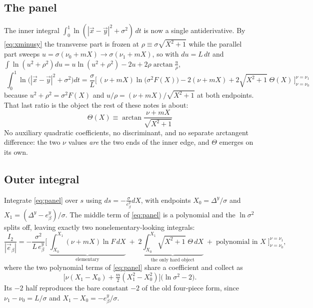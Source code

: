 \documentclass[11pt]{article}
\numberwithin{equation}{section}
\newcommand{\vv}[1]{\vec{#1}}
\begin{document}
\subsection{The panel}
The inner integral $\int_0^1\ln(|\vv x-\vv y|^2+\sigma^2)\,dt$ is now a single antiderivative. By
\eqref{eq:xminusy} the transverse part is frozen at $\rho\equiv\sigma\sqrt{X^2+1}$ while the parallel
part sweeps $u=\sigma(\nu_0+mX)\to\sigma(\nu_1+mX)$, so with $du=L\,dt$ and
$\int\ln(u^2+\rho^2)du=u\ln(u^2+\rho^2)-2u+2\rho\arctan\frac u\rho$,
\begin{equation}\label{eq:panel}
  \boxed{\;\int_0^1\!\ln\big(|\vv x-\vv y|^2+\sigma^2\big)dt
  =\frac\sigma L\Big[\,(\nu+mX)\ln\big(\sigma^2F(X)\big)-2(\nu+mX)
    +2\sqrt{X^2+1}\;\Theta(X)\,\Big]_{\nu=\nu_0}^{\nu=\nu_1}\;}
\end{equation}
because $u^2+\rho^2=\sigma^2F(X)$ and $u/\rho=(\nu+mX)/\sqrt{X^2+1}$ at both endpoints. That last ratio
is the object the rest of these notes is about:
\begin{equation}\label{eq:Itan}
  \boxed{\;\Theta(X)\equiv\arctan\frac{\nu+mX}{\sqrt{X^2+1}}\;}
\end{equation}
No auxiliary quadratic coefficients, no discriminant, and no separate arctangent difference: the two
$\nu$ values \emph{are} the two ends of the inner edge, and $\Theta$ emerges on its own.

\subsection{Outer integral}
Integrate \eqref{eq:panel} over $s$ using $ds=-\frac\sigma{e_\beta^y}dX$, with endpoints
$X_0=\Delta^y/\sigma$ and $X_1=(\Delta^y-e_\beta^y)/\sigma$. The middle term of \eqref{eq:panel} is a
polynomial and the $\ln\sigma^2$ splits off, leaving exactly two nonelementary-looking integrals:
\begin{equation}\label{eq:Isplit}
  \frac{I_2}{|\vv e_\beta|}=-\frac{\sigma^2}{L\,e_\beta^y}
  \bigg[\;\underbrace{\int_{X_0}^{X_1}\!(\nu+mX)\ln F\,dX}_{\text{elementary}}
  \;+\;2\underbrace{\int_{X_0}^{X_1}\!\sqrt{X^2+1}\;\Theta\,dX}_{\text{the only hard object}}
  \;+\;\text{polynomial in }X\;\bigg]_{\nu=\nu_0}^{\nu=\nu_1},
\end{equation}
where the two polynomial terms of \eqref{eq:panel} share a coefficient and collect as
\[
  \Big[\nu(X_1{-}X_0)+\tfrac m2(X_1^2{-}X_0^2)\Big]\big(\ln\sigma^2-2\big).
\]
Its $-2$ half reproduces the bare constant $-2$ of the old four-piece form, since
$\nu_1-\nu_0=L/\sigma$ and $X_1-X_0=-e_\beta^y/\sigma$.
\end{document}

